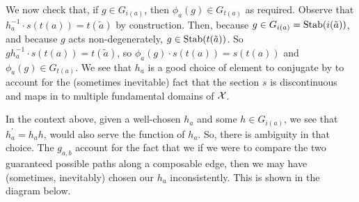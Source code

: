 We now check that, if $g \in G_{i(a)}$, then  $\phi_a(g) \in G_{t(a)}$ as required.
Observe that $h_a^{-1} \cdot s(t(a)) = t(\tilde{a})$ by construction.
Then, because $g \in G_{i(a)} = \operatorname{Stab}(i(\tilde{a}))$, and because  $g$ acts non-degenerately,  $g \in \operatorname{Stab}(t(\tilde{a}))$.
So  $gh_a^{-1} \cdot s(t(a)) = t(\tilde{a})$, so $\phi_a(g) \cdot s(t(a)) = s(t(a))$ and  $\phi_a(g) \in G_{t(a)}$.
We see that $h_a$ is a good choice of element to conjugate by to account for the (sometimes inevitable) fact that the section $s$ is discontinuous and maps in to multiple fundamental domains of $\mathcal{X}$.

In the context above, given a well-chosen $h_a$ and some $h \in G_{i(a)}$, we see that $h^\prime_a = h_ah$, would also serve the function of $h_a$.
So, there is ambiguity in that choice.
The $g_{a,b}$ account for the fact that we if we were to compare the two guaranteed possible paths along a composable edge, then we may have (sometimes, inevitably) chosen our $h_a$ inconsistently.
This is shown in the diagram below.

\begin{center}
\end{center}

